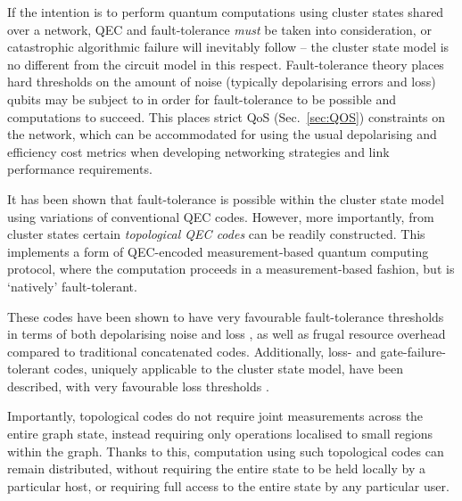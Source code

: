 

If the intention is to perform quantum computations using cluster states shared over a network, QEC and fault-tolerance \textit{must} be taken into consideration, or catastrophic algorithmic failure will inevitably follow -- the cluster state model is no different from the circuit model in this respect. Fault-tolerance theory places hard thresholds on the amount of noise (typically depolarising errors and loss) qubits may be subject to in order for fault-tolerance to be possible and computations to succeed. This places strict QoS (Sec.~\ref{sec:QOS}) constraints on the network, which can be accommodated for using the usual depolarising and efficiency cost metrics when developing networking strategies and link performance requirements.

It has been shown that fault-tolerance is possible within the cluster state model \cite{bib:NielsenDawson04, bib:Dawson06} using variations of conventional QEC codes. However, more importantly, from cluster states certain \textit{topological QEC codes} \cite{???} can be readily constructed. This implements a form of QEC-encoded measurement-based quantum computing protocol, where the computation proceeds in a measurement-based fashion, but is `natively' fault-tolerant.

These codes have been shown to have very favourable fault-tolerance thresholds in terms of both depolarising noise and loss \cite{bib:StaceBarrettDohertyLoss, bib:BarrettStaceFT}, as well as frugal resource overhead compared to traditional concatenated codes. Additionally, loss- and gate-failure-tolerant codes, uniquely applicable to the cluster state model, have been described, with very favourable loss thresholds \cite{bib:Varnava05, bib:RalphHayes05, bib:Duan05}. 

Importantly, topological codes do not require joint measurements across the entire graph state, instead requiring only operations localised to small regions within the graph. Thanks to this, computation using such topological codes can remain distributed, without requiring the entire state to be held locally by a particular host, or requiring full access to the entire state by any particular user.

